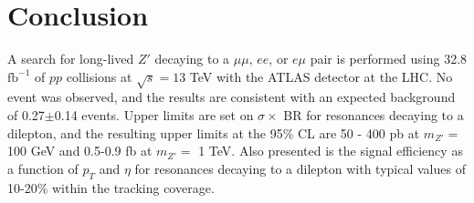 \chapter{Conclusion}
\label{chap:conclusion}

A search for long-lived $Z'$ decaying to a $\mu\mu$, $ee$, or $e\mu$ pair is performed using 32.8 $\mathrm{fb^{-1}}$ of $pp$ collisions at $\sqrt{s}=13$ TeV with the ATLAS detector at the LHC. No event was observed, and the results are consistent with an expected background of 0.27$\pm$0.14 events. Upper limits are set on $\sigma \times$ BR for resonances decaying to a dilepton, and the resulting upper limits at the 95\% CL are 50 - 400 pb at $m_{Z'}=$ 100 GeV and 0.5-0.9 fb at $m_{Z'}=$ 1 TeV. %
Also presented is the signal efficiency as a function of $p_{T}$ and $\eta$ for resonances decaying to a dilepton with typical values of 10-20\% within the tracking coverage.

